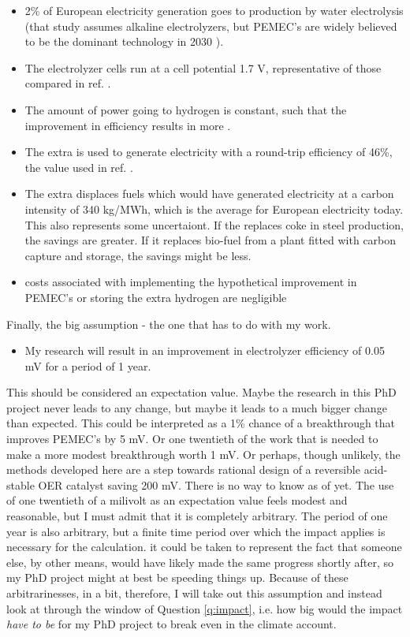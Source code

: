 \begin{itemize}
	\item 2\% of European electricity generation goes to  production by water electrolysis\cite{Sgobbi2016} (that study assumes alkaline electrolyzers, but PEMEC's are widely believed to be the dominant technology in 2030 \cite{Schmidt2017}).
	
	\item The electrolyzer cells run at a cell potential 1.7 V, representative of those compared in ref. .
	
	\item The amount of power going to hydrogen is constant, such that the improvement in efficiency results in more .
	
	\item The extra  is used to generate electricity with a round-trip efficiency of 46\%, the value used in ref. .
	
	\item The extra  displaces fuels which would have generated electricity at a carbon intensity of 340 kg/MWh, which is the average for European electricity today\cite{Moro2018}. This also represents some uncertaiont. If the  replaces coke in steel production, the savings are greater. If it replaces bio-fuel from a plant fitted with carbon capture and storage, the savings might be less.
	
	\item {} costs associated with implementing the hypothetical improvement in PEMEC's or storing the extra hydrogen are negligible
\end{itemize}
Finally, the big assumption - the one that has to do with my work. 
\begin{itemize}
	\item My research will result in an improvement in electrolyzer efficiency of 0.05 mV for a period of 1 year. 
\end{itemize}
This should be considered an expectation value. Maybe the research in this PhD project never leads to any change, but maybe it leads to a much bigger change than expected. This could be interpreted as a 1\% chance of a breakthrough that improves PEMEC's by 5 mV. Or one twentieth of the work that is needed to make a more modest breakthrough worth 1 mV. Or perhaps, though unlikely, the methods developed here are a step towards rational design of a reversible acid-stable OER catalyst saving 200 mV. There is no way to know as of yet. The use of one twentieth of a milivolt as an expectation value feels modest and reasonable, but I must admit that it is completely arbitrary. The period of one year is also arbitrary, but a finite time period over which the impact applies is necessary for the calculation. it could be taken to represent the fact that someone else, by other means, would have likely made the same progress shortly after, so my PhD project might at best be speeding things up. Because of these arbitrarinesses, in a bit, therefore, I will take out this assumption and instead look at through the window of Question \ref{q:impact}, i.e. how big would the impact \textit{have to be} for my PhD project to break even in the climate account.

